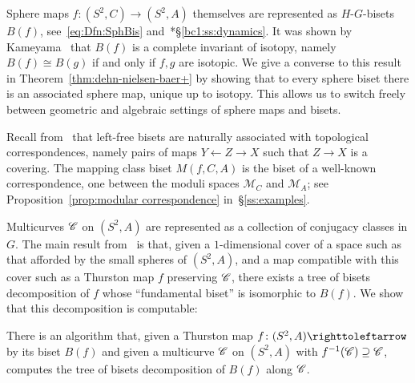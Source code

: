 \documentclass{amsart}
\begin{document}
Sphere maps $f\colon(S^2,C)\to (S^2,A)$ themselves are represented as
$H$-$G$-bisets $B(f)$, see~\eqref{eq:Dfn:SphBis}
and~\cite{bartholdi-dudko:bc1}*{\S\ref{bc1:ss:dynamics}}. It was shown
by Kameyama~\cite{kameyama:thurston} that $B(f)$ is a complete
invariant of isotopy, namely $B(f)\cong B(g)$ if and only if $f,g$ are
isotopic. We give a converse to this result in
Theorem~\ref{thm:dehn-nielsen-baer+} by showing that to every sphere
biset there is an associated sphere map, unique up to isotopy. This
allows us to switch freely between geometric and algebraic settings of
sphere maps and bisets.

Recall from~\cite{bartholdi-dudko:bc1} that left-free bisets are
naturally associated with topological correspondences, namely pairs of
maps $Y\leftarrow Z\to X$ such that $Z\to X$ is a covering. The
mapping class biset $M(f,C,A)$ is the biset of a well-known
correspondence, one between the moduli spaces $\mathscr M_C$ and
$\mathscr M_A$; see Proposition~\ref{prop:modular correspondence}
in~\S\ref{ss:examples}.

Multicurves ${\mathscr C}$ on $(S^2,A)$ are represented as a collection of
conjugacy classes in $G$. The main result
from~\cite{bartholdi-dudko:bc1} is that, given a $1$-dimensional
cover of a space such as that afforded by the small spheres of
$(S^2,A)$, and a map compatible with this cover such as a Thurston map
$f$ preserving ${\mathscr C}$, there exists a tree of bisets decomposition of
$f$ whose ``fundamental biset'' is isomorphic to $B(f)$. We show that
this decomposition is computable:
\begin{mainthm}
  There is an algorithm that, given a Thurston map
  $f\colon(S^2,A)\selfmap$ by its biset $B(f)$ and given a multicurve
  ${\mathscr C}$ on $(S^2,A)$ with $f^{-1}({\mathscr C})\supseteq{\mathscr C}$, computes the tree
  of bisets decomposition of $B(f)$ along ${\mathscr C}$.
\end{mainthm}
\end{document}

